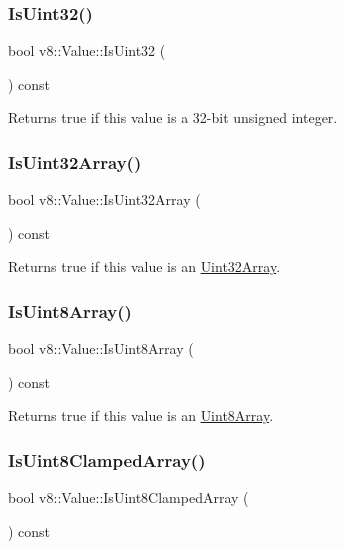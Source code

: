 \subsubsection{\texorpdfstring{Is\+Uint32()}{IsUint32()}}
{\footnotesize\ttfamily bool v8\+::\+Value\+::\+Is\+Uint32 (\begin{DoxyParamCaption}{ }\end{DoxyParamCaption}) const}

Returns true if this value is a 32-\/bit unsigned integer. \mbox{\label{classv8_1_1Value_a52fe549df18b0c77a875d7aa61f87317}} 
\subsubsection{\texorpdfstring{Is\+Uint32\+Array()}{IsUint32Array()}}
{\footnotesize\ttfamily bool v8\+::\+Value\+::\+Is\+Uint32\+Array (\begin{DoxyParamCaption}{ }\end{DoxyParamCaption}) const}

Returns true if this value is an \mbox{\hyperlink{classv8_1_1Uint32Array}{Uint32\+Array}}. \mbox{\label{classv8_1_1Value_af11d828f1a78df0de696e210571b7860}} 
\subsubsection{\texorpdfstring{Is\+Uint8\+Array()}{IsUint8Array()}}
{\footnotesize\ttfamily bool v8\+::\+Value\+::\+Is\+Uint8\+Array (\begin{DoxyParamCaption}{ }\end{DoxyParamCaption}) const}

Returns true if this value is an \mbox{\hyperlink{classv8_1_1Uint8Array}{Uint8\+Array}}. \mbox{\label{classv8_1_1Value_a655a46fa71c8a33d138756d8a6c515ac}} 
\subsubsection{\texorpdfstring{Is\+Uint8\+Clamped\+Array()}{IsUint8ClampedArray()}}
{\footnotesize\ttfamily bool v8\+::\+Value\+::\+Is\+Uint8\+Clamped\+Array (\begin{DoxyParamCaption}{ }\end{DoxyParamCaption}) const}

